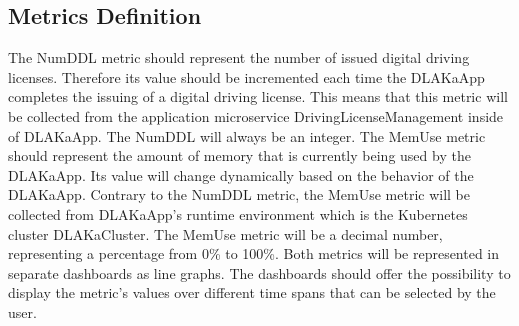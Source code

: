 





\subsection{Metrics Definition}
The NumDDL metric should represent the number of issued digital driving licenses.
Therefore its value should be incremented each time the DLAKaApp completes the issuing of
a digital driving license. This means that this metric will be collected from the application
microservice DrivingLicenseManagement inside of DLAKaApp. The NumDDL will always be an integer.
The MemUse metric should represent the amount of memory that is currently being used by the
DLAKaApp. Its value will change dynamically based on the behavior of the DLAKaApp.
Contrary to the NumDDL metric, the MemUse metric will be collected from DLAKaApp's runtime
environment which is the Kubernetes cluster DLAKaCluster. The MemUse metric will be a decimal number,
representing a percentage from 0\% to 100\%.
Both metrics will be represented in separate dashboards as line graphs.
The dashboards should offer the possibility to display the metric's values over different time spans
that can be selected by the user.

